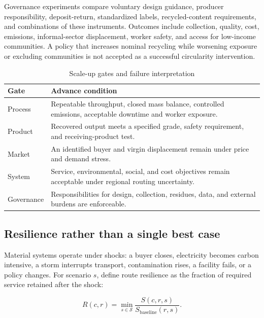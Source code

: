 \documentclass[conference]{IEEEtran}
\begin{document}
Governance experiments compare voluntary design guidance, producer responsibility, deposit-return, standardized labels, recycled-content requirements, and combinations of these instruments. Outcomes include collection, quality, cost, emissions, informal-sector displacement, worker safety, and access for low-income communities. A policy that increases nominal recycling while worsening exposure or excluding communities is not accepted as a successful circularity intervention.

\begin{table}[t]
\caption{Scale-up gates and failure interpretation}
\label{tab:gates}
\centering
\footnotesize
\setlength{\tabcolsep}{3pt}
\begin{tabular}{p{}p{}}
\toprule
Gate & Advance condition\\
\midrule
Process & Repeatable throughput, closed mass balance, controlled emissions, acceptable downtime and worker exposure.\\
Product & Recovered output meets a specified grade, safety requirement, and receiving-product test.\\
Market & An identified buyer and virgin displacement remain under price and demand stress.\\
System & Service, environmental, social, and cost objectives remain acceptable under regional routing uncertainty.\\
Governance & Responsibilities for design, collection, residues, data, and external burdens are enforceable.\\
\bottomrule
\end{tabular}
\end{table}

\subsection{Resilience rather than a single best case}

Material systems operate under shocks: a buyer closes, electricity becomes carbon intensive, a storm interrupts transport, contamination rises, a facility fails, or a policy changes. For scenario $s$, define route resilience as the fraction of required service retained after the shock:

\begin{equation}
R(c,r)=\min_{s\in\mathcal{S}}\frac{S(c,r,s)}{S_{\mathrm{baseline}}(r,s)}.
\label{eq:resilience}
\end{equation}
\end{document}
